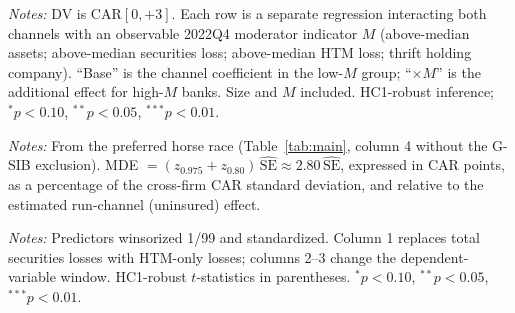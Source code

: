 \documentclass[12pt]{article}
\begin{document}
\begin{table}[htbp]\centering
\begin{threeparttable}
\caption{Heterogeneity of the two channels by observable moderators}\label{tab:hetero}\small

\begin{tablenotes}\small\item \textit{Notes:} DV is CAR$[0,+3]$. Each row is a separate
regression interacting both channels with an observable 2022Q4 moderator indicator $M$
(above-median assets; above-median securities loss; above-median HTM loss; thrift holding
company). ``Base'' is the channel coefficient in the low-$M$ group; ``$\times M$'' is the
additional effect for high-$M$ banks. Size and $M$ included. HC1-robust inference;
$^{*}p<0.10$, $^{**}p<0.05$, $^{***}p<0.01$.
\end{tablenotes}
\end{threeparttable}
\end{table}

\begin{table}[htbp]\centering
\begin{threeparttable}
\caption{Minimum detectable effects (80\% power)}\label{tab:power}\small

\begin{tablenotes}\small\item \textit{Notes:} From the preferred horse race (Table~\ref{tab:main},
column 4 without the G-SIB exclusion). MDE $=(z_{0.975}+z_{0.80})\,\widehat{\text{SE}}\approx
2.80\,\widehat{\text{SE}}$, expressed in CAR points, as a percentage of the cross-firm CAR
standard deviation, and relative to the estimated run-channel (uninsured) effect.
\end{tablenotes}
\end{threeparttable}
\end{table}

\begin{table}[htbp]\centering
\begin{threeparttable}
\caption{Robustness: HTM-only losses and alternative windows}\label{tab:robust}\small

\begin{tablenotes}\small\item \textit{Notes:} Predictors winsorized 1/99 and standardized.
Column 1 replaces total securities losses with HTM-only losses; columns 2--3 change the
dependent-variable window. HC1-robust $t$-statistics in parentheses. $^{*}p<0.10$,
$^{**}p<0.05$, $^{***}p<0.01$.
\end{tablenotes}
\end{threeparttable}
\end{table}
\end{document}
